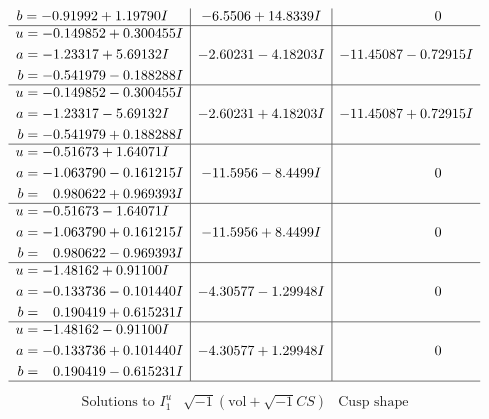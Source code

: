 \documentclass[1p]{elsarticle_modified}
\theoremstyle{definition}
\newcommand{\I}{\sqrt{-1}}
\begin{document}
$$\begin{array}{c|c|c}
\begin{aligned}
b &= -0.91992 + 1.19790 I\end{aligned}
 & -6.5506 + 14.8339 I & \phantom{-0.000000 } 0 \\ \hline\begin{aligned}
u &= -0.149852 + 0.300455 I \\
a &= -1.23317 + 5.69132 I \\
b &= -0.541979 - 0.188288 I\end{aligned}
 & -2.60231 - 4.18203 I & -11.45087 - 0.72915 I \\ \hline\begin{aligned}
u &= -0.149852 - 0.300455 I \\
a &= -1.23317 - 5.69132 I \\
b &= -0.541979 + 0.188288 I\end{aligned}
 & -2.60231 + 4.18203 I & -11.45087 + 0.72915 I \\ \hline\begin{aligned}
u &= -0.51673 + 1.64071 I \\
a &= -1.063790 - 0.161215 I \\
b &= \phantom{-}0.980622 + 0.969393 I\end{aligned}
 & -11.5956 - 8.4499 I & \phantom{-0.000000 } 0 \\ \hline\begin{aligned}
u &= -0.51673 - 1.64071 I \\
a &= -1.063790 + 0.161215 I \\
b &= \phantom{-}0.980622 - 0.969393 I\end{aligned}
 & -11.5956 + 8.4499 I & \phantom{-0.000000 } 0 \\ \hline\begin{aligned}
u &= -1.48162 + 0.91100 I \\
a &= -0.133736 - 0.101440 I \\
b &= \phantom{-}0.190419 + 0.615231 I\end{aligned}
 & -4.30577 - 1.29948 I & \phantom{-0.000000 } 0 \\ \hline\begin{aligned}
u &= -1.48162 - 0.91100 I \\
a &= -0.133736 + 0.101440 I \\
b &= \phantom{-}0.190419 - 0.615231 I\end{aligned}
 & -4.30577 + 1.29948 I & \phantom{-0.000000 } 0\\
 \hline 
 \end{array}$$\newpage$$\begin{array}{c|c|c}  
\text{Solutions to }I^u_{1}& \I (\text{vol} + \sqrt{-1}CS) & \text{Cusp shape}\\

\end{array}$$
\end{document}
